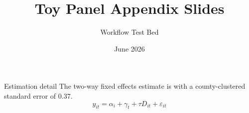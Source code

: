 \documentclass[11pt]{beamer}
\title{Toy Panel Appendix Slides}
\author{Workflow Test Bed}
\date{June 2026}
\begin{document}
\begin{frame}
  \titlepage
\end{frame}

\begin{frame}{Estimation detail}
  The two-way fixed effects estimate is \attestimate{} with a
  county-clustered standard error of 0.37.
  \begin{equation*}
    y_{it} = \alpha_i + \gamma_t + \tau D_{it} + \varepsilon_{it}
  \end{equation*}
\end{frame}
\end{document}
